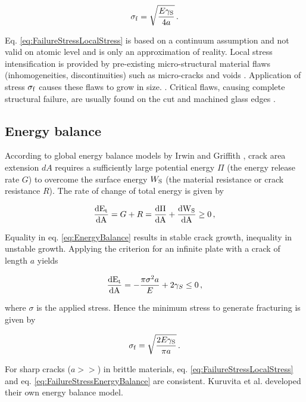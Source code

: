 \documentclass[format=acmtog, 12pt, screen=true, review=false]{acmart}
\begin{document}
\begin{equation}
    \label{eq:FailureStressLocalStress}
    \sigma_{\rm{f}}=\sqrt{\frac{E\gamma_{\rm{S}}}{4a}} \,.
\end{equation}

Eq. \ref{eq:FailureStressLocalStress} is based on a continuum assumption and not valid on atomic level and is only an approximation of reality. Local stress intensification is provided by pre-existing micro-structural material flaws (inhomogeneities, discontinuities) such as micro-cracks and voids \cite{Sch12}. Application of stress $\sigma_{\rm{f}}$ causes these flaws to grow in size. \cite{Flo98, Pel16}. Critical flaws, causing complete structural failure, are usually found on the cut and machined glass edges \cite{Pel16}.

\subsection{Energy balance}

According to global energy balance models by Irwin and Griffith \cite{Sch12, And05}, crack area extension $dA$ requires a sufficiently large potential energy $\Pi$ (the energy release rate $G$) to overcome the surface energy $W_{\rm{S}}$ (the material resistance or crack resistance $R$). The rate of change of total energy is given by

\begin{equation}
    \label{eq:EnergyBalance}
    \frac{\rm{d}E_{\rm{t}}}{\rm{d}A}=G+R=\frac{\rm{d}\Pi}{\rm{d}A}+\frac{\rm{d}W_{\rm{S}}}{\rm{d}A}\geq0\,,
\end{equation}

Equality in eq. \ref{eq:EnergyBalance} results in stable crack growth, inequality in unstable growth. Applying the criterion for an infinite plate with a crack of length $a$ yields

\begin{equation}
\frac{\rm{d}E_{\rm{t}}}{\rm{d}A}=-\frac{\pi\sigma^2a}{E}+2\gamma_S\leq0\,,
\end{equation}

where $\sigma$ is the applied stress. Hence the minimum stress to generate fracturing is given by

\begin{equation}
    \label{eq:FailureStressEnergyBalance}
    \sigma_{\rm{f}} = \sqrt{\frac{2E\gamma_{\rm{S}}}{\pi a}}\,.
\end{equation}

For sharp cracks ($a>>$) in brittle materials, eq. \ref{eq:FailureStressLocalStress} and eq. \ref{eq:FailureStressEnergyBalance} are consistent. Kuruvita et al. \cite{Kur14} developed their own energy balance model.
\end{document}
